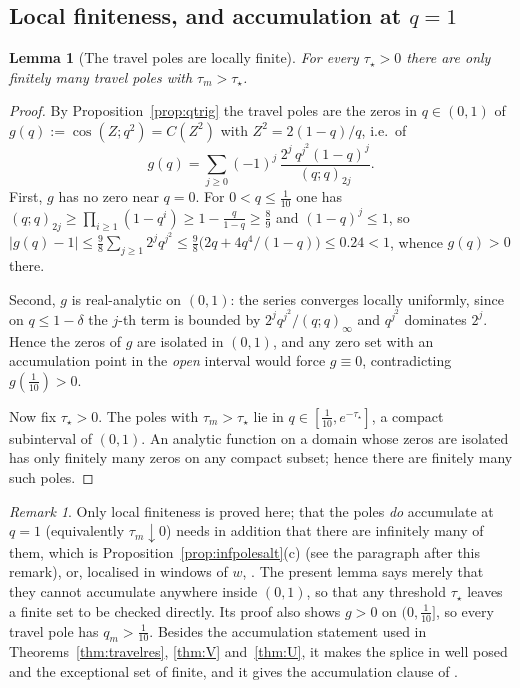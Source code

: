 \documentclass[11pt]{article}
\theoremstyle{plain}
\newtheorem{lemma}[theorem]{Lemma}
\theoremstyle{definition}
\theoremstyle{remark}
\newtheorem{remark}[theorem]{Remark}
\theoremstyle{plain}\newtheorem*{maintheorem}{Main Theorem}
\begin{document}
\subsection{Local finiteness, and accumulation at $q=1$}\label{sec:polefinite}

\begin{lemma}[The travel poles are locally finite]\label{lem:polefinite}
For every $\tau_\star>0$ there are only finitely many travel poles with $\tau_m>\tau_\star$.
\end{lemma}

\begin{proof}
By Proposition~\ref{prop:qtrig} the travel poles are the zeros in $q\in(0,1)$ of
$g(q):=\cos(Z;q^2)=C(Z^2)$ with $Z^2=2(1-q)/q$, i.e.\ of
\[
 g(q)=\sum_{j\ge0}(-1)^j\,\frac{2^j\,q^{j^2}(1-q)^j}{(q;q)_{2j}} .
\]
First, $g$ has no zero near $q=0$. For $0<q\le\tfrac1{10}$ one has
$(q;q)_{2j}\ge\prod_{i\ge1}(1-q^i)\ge1-\tfrac q{1-q}\ge\tfrac89$ and $(1-q)^j\le1$, so
$|g(q)-1|\le\tfrac98\sum_{j\ge1}2^jq^{j^2}\le\tfrac98\bigl(2q+4q^4/(1-q)\bigr)\le0.24<1$, whence
$g(q)>0$ there.

Second, $g$ is real-analytic on $(0,1)$: the series converges locally uniformly, since on
$q\le1-\delta$ the $j$-th term is bounded by $2^jq^{j^2}/(q;q)_\infty$ and $q^{j^2}$ dominates $2^j$.
Hence the zeros of $g$ are isolated in $(0,1)$, and any zero set with an accumulation point in the
\emph{open} interval would force $g\equiv0$, contradicting $g(\tfrac1{10})>0$.

Now fix $\tau_\star>0$. The poles with $\tau_m>\tau_\star$ lie in $q\in[\tfrac1{10},e^{-\tau_\star}]$,
a compact subinterval of $(0,1)$. An analytic function on a domain whose zeros are isolated has only
finitely many zeros on any compact subset; hence there are finitely many such poles.
\end{proof}

\begin{remark}
Only local finiteness is proved here; that the poles \emph{do} accumulate at $q=1$
(equivalently $\tau_m\downarrow0$) needs in addition that there are infinitely many of them, which
is Proposition~\ref{prop:infpolesalt}\textup{(c)} (see the paragraph after this remark), or,
localised in windows of $w$, \cite[Lemma ``infinitude and accumulation of the travel poles'',
\textup{lem:infpoles}]{Bonfioli2026bB}. The present lemma says merely that
they cannot accumulate anywhere inside $(0,1)$, so that any threshold $\tau_\star$ leaves a finite
set to be checked directly. Its proof also shows $g>0$ on $(0,\tfrac1{10}]$, so every travel pole
has $q_m>\tfrac1{10}$. Besides the accumulation statement used in Theorems~\ref{thm:travelres},
\ref{thm:V} and~\ref{thm:U}, it makes the splice in
\cite[Proposition \textup{prop:selower}]{Bonfioli2026bB} well posed and the exceptional set of
\cite[Theorem ``the amplitude estimate $(\star)$'', \textup{thm:star}]{Bonfioli2026bB} finite, and it
gives the accumulation clause of \cite[Lemma \textup{lem:infpoles}]{Bonfioli2026bB}.
\end{remark}
\end{document}
